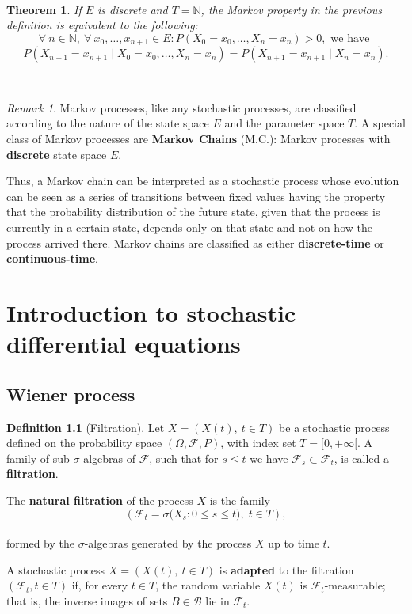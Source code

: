 \documentclass[
  11pt,
  a4paper,
]{book}
\newtheorem{theorem}{Theorem}[chapter]
\theoremstyle{definition}
\newtheorem{definition}{Definition}[chapter]
\theoremstyle{definition}
\theoremstyle{definition}
\theoremstyle{definition}
\theoremstyle{remark}
\newtheorem*{remark}{Remark}
\begin{document}
\(\,\)

\begin{theorem}
If \(E\) is discrete and \(T = \mathbb{N}\), the Markov property in the previous definition is equivalent to the following:
\[
\forall ~n \in \mathbb{N}, ~\forall ~x_0, \ldots, x_{n+1} \in E: P(X_0 = x_0, \ldots, X_n = x_n) > 0, \text{ we have }
\]
\[
P(X_{n+1} = x_{n+1} \mid X_0 = x_0, \ldots, X_n = x_n) = P(X_{n+1} = x_{n+1} \mid X_n = x_n).
\]
\end{theorem}

\(\,\)

\begin{remark}
Markov processes, like any stochastic processes, are classified according to the nature of the state space \(E\) and the parameter space \(T\). A special class of Markov processes are \textbf{Markov Chains} (M.C.): Markov processes with \textbf{discrete} state space \(E\).

Thus, a Markov chain can be interpreted as a stochastic process whose evolution can be seen as a series of transitions between fixed values having the property that the probability distribution of the future state, given that the process is currently in a certain state, depends only on that state and not on how the process arrived there. Markov chains are classified as either \textbf{discrete-time} or \textbf{continuous-time}.
\end{remark}

\chapter{Introduction to stochastic differential equations}\label{sde}

\section{Wiener process}\label{wiener-process}

\begin{definition}[Filtration]
Let \(X = (X(t), ~ t \in T)\) be a stochastic process defined on the probability space \((\Omega, \mathcal{F}, P)\), with index set \(T = [0, +\infty[\). A family of sub-\(\sigma\)-algebras of \(\mathcal{F}\), such that for \(s \leq t\) we have \(\mathcal{F}_s \subset \mathcal{F}_t\), is called a \textbf{filtration}.

The \textbf{natural filtration} of the process \(X\) is the family\\
\[
\left(\mathcal{F}_t = \sigma\big(X_s : 0 \leq s \leq t\big), \; t \in T\right),
\]\\
formed by the \(\sigma\)-algebras generated by the process \(X\) up to time \(t\).

A stochastic process \(X = (X(t), ~ t \in T)\) is \textbf{adapted} to the filtration \((\mathcal{F}_t, t \in T)\) if, for every \(t \in T\), the random variable \(X(t)\) is \(\mathcal{F}_t\)-measurable; that is, the inverse images of sets \(B \in \mathcal{B}\) lie in \(\mathcal{F}_t\).
\end{definition}
\end{document}
